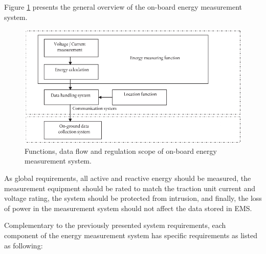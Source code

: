 \newpage

Figure \ref{fig:EMS} presents the general overview of the on-board energy measurement system.

\begin{figure}[h!]
	\centering
	\includegraphics[width=\textwidth,keepaspectratio]{figures/34.SmartM/EMS}
	\caption{Functions, data flow and regulation scope of on-board energy measurement system.}
	\label{fig:EMS}
\end{figure}

As global requirements, all active and reactive energy should be measured, the measurement equipment should be rated to match the traction unit current and voltage rating, the system should be protected from intrusion, and finally, the loss of power in the  measurement system should not affect the data stored in \ac{EMS}.

Complementary to the previously presented system requirements, each component of the energy measurement system has specific requirements as listed as following:

